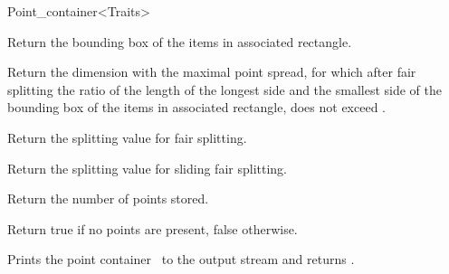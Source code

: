 \begin{ccRefClass}{Point_container<Traits>}
\begin{ccAdvanced}
{Return the bounding box of the items in associated rectangle.}

{Return the dimension with the maximal point spread, for which after fair splitting
the ratio of the length of the longest side and the smallest side of the bounding box of
the items in associated rectangle,
does not exceed .}

{Return the splitting value for fair splitting.}

{Return the splitting value for sliding fair splitting.}

{
Return the number of points stored.
}

{
Return true if no points are present, false otherwise.
}





{Prints the point container \ccVar\ to the output stream  and returns .}


\ccSeeAlso

\\

\end{ccAdvanced}
\end{ccRefClass}


